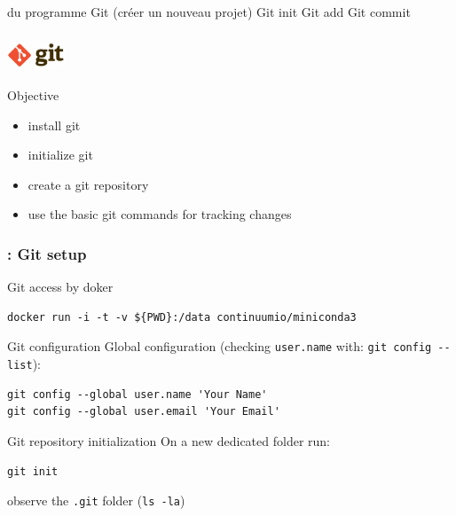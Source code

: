 \begin{frame}{du programme}
Git (créer un nouveau projet)
Git init
Git add 
Git commit 
\end{frame}
\begin{frame}[containsverbatim]
\frametitle{\includegraphics[height=0.8cm]{shared/logo-git.png}}
\begin{exampleblock}{Objective}
\begin{itemize}
    \item install git
    \item initialize git
    \item create a git repository
    \item use the basic git commands for tracking changes
\end{itemize}
\end{exampleblock}
\end{frame}
\begin{frame}[containsverbatim]
\frametitle{: Git setup}
\begin{exampleblock}{Git access by \alert{doker}}
\begin{lstlisting}
docker run -i -t -v ${PWD}:/data continuumio/miniconda3
\end{lstlisting}
\end{exampleblock}
\begin{exampleblock}{Git configuration}
Global configuration (checking \verb|user.name| with: \verb|git config --list|):
\begin{lstlisting}
git config --global user.name 'Your Name'
git config --global user.email 'Your Email'
\end{lstlisting}
\end{exampleblock}
\begin{exampleblock}{Git repository initialization}
On a new dedicated folder run: 
\begin{lstlisting}
git init
\end{lstlisting}
observe the \verb|.git| folder (\verb|ls -la|)
\end{exampleblock}
\end{frame}
